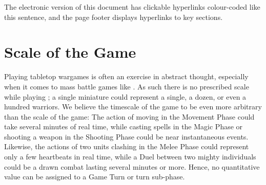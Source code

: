 \begin{hidewhenprinted}\textcolor{linkcolour}{The electronic version of this document has clickable hyperlinks colour-coded like this sentence, and the page footer displays hyperlinks to key sections.}\end{hidewhenprinted}


\begin{center}
\begin{framed}
\license
\end{framed}
\end{center}

\noindent \latexcredit

\columnbreak
\section{Scale of the Game}

Playing tabletop wargames is often an exercise in abstract thought, especially when it comes to mass battle games like \theninthage{}. As such there is no prescribed scale while playing \theninthage{}; a single miniature could represent a single, a dozen, or even a hundred warriors. We believe the timescale of the game to be even more arbitrary than the scale of the game: The action of moving in the Movement Phase could take several minutes of real time, while casting spells in the Magic Phase or shooting a weapon in the Shooting Phase could be near instantaneous events. Likewise, the actions of two units clashing in the Melee Phase could represent only a few heartbeats in real time, while a Duel between two mighty individuals could be a drawn combat lasting several minutes or more. Hence, no quantitative value can be assigned to a Game Turn or turn sub-phase.

\RBemc
